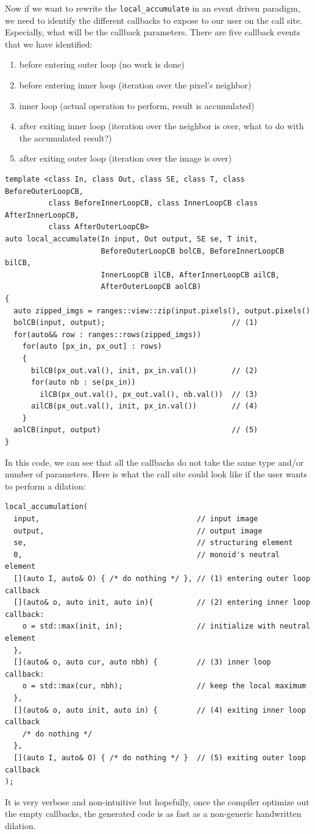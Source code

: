 Now if we want to rewrite the \texttt{local\_accumulate} in an event driven paradigm, we need to identify the different
callbacks to expose to our user on the call site. Especially, what will be the callback parameters. There are five
callback events that we have identified:
\begin{enumerate}
  \item before entering outer loop (no work is done)
  \item before entering inner loop (iteration over the pixel's neighbor)
  \item inner loop (actual operation to perform, result is accumulated)
  \item after exiting inner loop (iteration over the neighbor is over, what to do with the accumulated result?)
  \item after exiting outer loop (iteration over the image is over)
\end{enumerate}
\begin{verbatim}
template <class In, class Out, class SE, class T, class BeforeOuterLoopCB,
          class BeforeInnerLoopCB, class InnerLoopCB class AfterInnerLoopCB,
          class AfterOuterLoopCB>
auto local_accumulate(In input, Out output, SE se, T init,
                      BeforeOuterLoopCB bolCB, BeforeInnerLoopCB bilCB,
                      InnerLoopCB ilCB, AfterInnerLoopCB ailCB,
                      AfterOuterLoopCB aolCB)
{
  auto zipped_imgs = ranges::view::zip(input.pixels(), output.pixels()
  bolCB(input, output);                             // (1)
  for(auto&& row : ranges::rows(zipped_imgs))
    for(auto [px_in, px_out] : rows)
    {
      bilCB(px_out.val(), init, px_in.val())        // (2)
      for(auto nb : se(px_in))
        ilCB(px_out.val(), px_out.val(), nb.val())  // (3)
      ailCB(px_out.val(), init, px_in.val())        // (4)
    }
  aolCB(input, output)                              // (5)
}
\end{verbatim}
In this code, we can see that all the callbacks do not take the same type and/or number of parameters. Here is what the
call site could look like if the user wants to perform a dilation:
\begin{verbatim}
local_accumulation(
  input,                                    // input image
  output,                                   // output image
  se,                                       // structuring element
  0,                                        // monoid's neutral element
  [](auto I, auto& O) { /* do nothing */ }, // (1) entering outer loop callback
  [](auto& o, auto init, auto in){          // (2) entering inner loop callback:
    o = std::max(init, in);                 // initialize with neutral element
  },
  [](auto& o, auto cur, auto nbh) {         // (3) inner loop callback:
    o = std::max(cur, nbh);                 // keep the local maximum
  },
  [](auto& o, auto init, auto in) {         // (4) exiting inner loop callback
    /* do nothing */
  },
  [](auto I, auto& O) { /* do nothing */ }  // (5) exiting outer loop callback
);
\end{verbatim}
It is very verbose and non-intuitive but hopefully, once the compiler optimize out the empty callbacks, the generated
code is as fast as a non-generic handwritten dilation.

